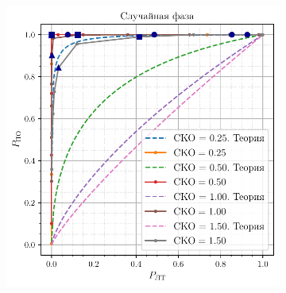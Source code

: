 \begin{figure}[H]
\begin{subfigure}{0.49\linewidth}
        \includegraphics[width=\linewidth]{data/data_phase.pdf}
    \end{subfigure}
\end{figure}
